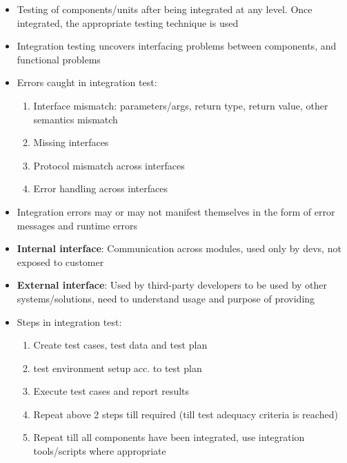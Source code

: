 \documentclass{article}
\begin{document}
\begin{itemize}
    \item Testing of components/units after being integrated at any level. Once integrated, the appropriate testing technique is used
    
    \item Integration testing uncovers interfacing problems between components, and functional problems
    
    \item Errors caught in integration test:
    \begin{enumerate}
        \item Interface mismatch: parameters/args, return type, return value, other semantics mismatch
        
        \item Missing interfaces
        
        \item Protocol mismatch across interfaces
        
        \item Error handling across interfaces
    \end{enumerate}
    
    \item Integration errors may or may not manifest themselves in the form of error messages and runtime errors
    
    \item \textbf{Internal interface}: Communication across modules, used only by devs, not exposed to customer
    
    \item \textbf{External interface}: Used by third-party developers to be used by other systems/solutions, need to understand usage and purpose of providing
    
    \item Steps in integration test:
    \begin{enumerate}
        \item Create test cases, test data and test plan
        
        \item test environment setup acc. to test plan
        
        \item Execute test cases and report results
        
        \item Repeat above 2 steps till required (till test adequacy criteria is reached)
        
        \item Repeat till all components have been integrated, use integration tools/scripts where appropriate
    \end{enumerate}
    
\end{itemize}
\end{document}
